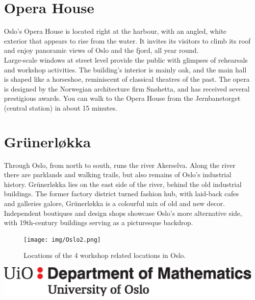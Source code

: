 \documentclass{article}
\begin{document}
\vspace{1cm}

\section*{Opera House}
Oslo's Opera House is located right at the harbour, with an angled, white exterior that appears to rise from the water. It invites its visitors to climb its roof and enjoy panoramic views of Oslo and the fjord, all year round. \\
Large-scale windows at street level provide the public with glimpses of rehearsals and workshop activities. The building's interior is mainly oak, and the main hall is shaped like a horseshoe, reminiscent of classical theatres of the past. The opera is designed by the Norwegian architecture firm Snøhetta, and has received several prestigious awards. You can walk to the Opera House from the Jernbanetorget (central station) in about 15 minutes.

\clearpage

\section*{Gr\"unerløkka}
Through Oslo, from north to south, runs the river Akerselva. Along the river there are parklands and walking trails, but also remains of Oslo’s industrial history.
Gr\"unerløkka lies on the east side of the river, behind the old industrial buildings. The former factory district turned fashion hub, with laid-back cafes and galleries galore, Gr\"unerløkka is a colourful mix of old and new decor. Independent boutiques and design shops showcase Oslo’s more alternative side, with 19th-century buildings serving as a picturesque backdrop.

\bigskip
\bigskip

\begin{figure}[h]
    \centering
   \texttt{[image: img/Oslo2.png]} 
    \caption{Locations of the 4 workshop related locations in Oslo.}
    \label{fig:Oslo}
\end{figure}




\clearpage



\includegraphics[scale=0.3]{img/mat-mn-navn-eng.eps}
\end{document}

